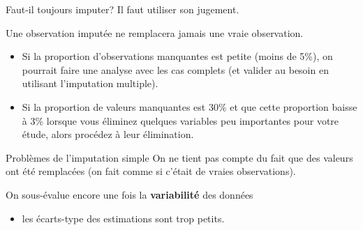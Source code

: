 \documentclass[
  ignorenonframetext,
]{beamer}
\providecommand{\tightlist}{%
  \setlength{\itemsep}{0pt}\setlength{\parskip}{0pt}}\usepackage{longtable,booktabs,array}
\begin{document}
\begin{frame}{Faut-il toujours imputer?}
\label{faut-il-toujours-imputer}
Il faut utiliser son jugement.

Une observation imputée ne remplacera jamais une vraie observation.

\begin{itemize}
\tightlist
\item
  Si la proportion d'observations manquantes est petite (moins de 5\%),
  on pourrait faire une analyse avec les cas complets (et valider au
  besoin en utilisant l'imputation multiple).
\item
  Si la proportion de valeurs manquantes est 30\% et que cette
  proportion baisse à 3\% lorsque vous éliminez quelques variables peu
  importantes pour votre étude, alors procédez à leur élimination.
\end{itemize}
\end{frame}

\begin{frame}{Problèmes de l'imputation simple}
\label{probluxe8mes-de-limputation-simple}
On ne tient pas compte du fait que des valeurs ont été remplacées (on
fait comme si c'était de vraies observations).

On sous-évalue encore une fois la \textbf{variabilité} des données

\begin{itemize}
\tightlist
\item
  les écarts-type des estimations sont trop petits.
\end{itemize}
\end{frame}
\end{document}
